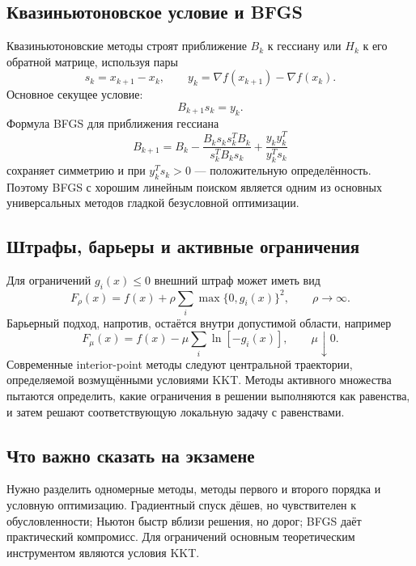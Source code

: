 \subsection{Квазиньютоновское условие и BFGS}

Квазиньютоновские методы строят приближение $B_k$ к гессиану или $H_k$ к его обратной
матрице, используя пары
\[
    s_k=x_{k+1}-x_k,
    \qquad
    y_k=\nabla f(x_{k+1})-\nabla f(x_k).
\]
Основное секущее условие:
\[
    B_{k+1}s_k=y_k.
\]
Формула BFGS для приближения гессиана
\[
 B_{k+1}
 =B_k-\frac{B_ks_ks_k^TB_k}{s_k^TB_ks_k}
 +\frac{y_ky_k^T}{y_k^Ts_k}
\]
сохраняет симметрию и при $y_k^Ts_k>0$ --- положительную определённость. Поэтому BFGS
с хорошим линейным поиском является одним из основных универсальных методов гладкой
безусловной оптимизации.

\subsection{Штрафы, барьеры и активные ограничения}

Для ограничений $g_i(x)\le0$ внешний штраф может иметь вид
\[
    F_\rho(x)=f(x)+\rho\sum_i\max\{0,g_i(x)\}^2,
    \qquad \rho\to\infty.
\]
Барьерный подход, напротив, остаётся внутри допустимой области, например
\[
    F_\mu(x)=f(x)-\mu\sum_i\ln[-g_i(x)],
    \qquad \mu\downarrow0.
\]
Современные interior-point методы следуют центральной траектории, определяемой
возмущёнными условиями KKT. Методы активного множества пытаются определить, какие
ограничения в решении выполняются как равенства, и затем решают соответствующую
локальную задачу с равенствами.

\subsection{Что важно сказать на экзамене}

Нужно разделить одномерные методы, методы первого и второго порядка и условную
оптимизацию. Градиентный спуск дёшев, но чувствителен к обусловленности; Ньютон
быстр вблизи решения, но дорог; BFGS даёт практический компромисс. Для ограничений
основным теоретическим инструментом являются условия KKT.

\newpage